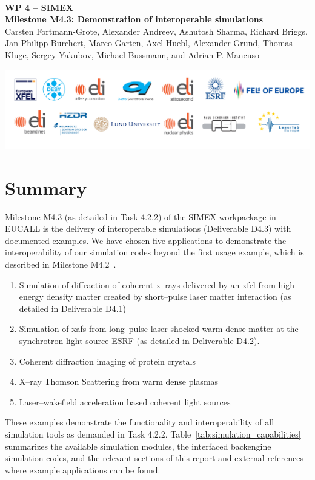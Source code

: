 \documentclass[12pt]{scrartcl}
\begin{document}
\makeatletter
\begin{titlepage}
\thispagestyle{scrheadings}
\begin{center}
  $~$\\
  \vspace{2cm}
  \Huge{\textbf{WP 4 -- SIMEX\\[1cm]
    Milestone M4.3: Demonstration of interoperable simulations%
  }}\\
  \vspace{2cm}
  \large{Carsten Fortmann-Grote, Alexander Andreev, Ashutosh Sharma, Richard
    Briggs, Jan-Philipp Burchert, Marco Garten, Axel Huebl, Alexander Grund,
  Thomas Kluge, Sergey Yakubov, Michael Bussmann, and Adrian P. Mancuso}
  \vspace{1cm}
  \date{\today}
\end{center}
\vfill%
\includegraphics[width=\textwidth]{figures/PartnerLogos_2017}
\end{titlepage}
\makeatother
%
\tableofcontents
%
\newpage
%
\section{Summary}\label{sec:summary}
Milestone M4.3 (as detailed in Task 4.2.2) of the SIMEX
workpackage in EUCALL is the delivery of interoperable simulations
(Deliverable D4.3) with documented examples. We have chosen five
applications to demonstrate the interoperability of our simulation codes beyond
the first usage example, which is described in Milestone
M4.2~\cite{EUCALL_SIMEX_M4.2}.
%
\begin{enumerate}
  \item Simulation of diffraction of coherent x--rays delivered by an
    \gls{xfel}
    from high energy density matter created by short--pulse
    laser matter interaction (as detailed in Deliverable D4.1)
  \item Simulation of \gls{xafs} from long--pulse laser
    shocked warm dense matter at the synchrotron light source ESRF (as detailed
    in Deliverable D4.2).
  \item Coherent diffraction imaging of protein crystals
  \item X--ray Thomson Scattering from warm dense plasmas
  \item Laser--wakefield acceleration based coherent light sources
\end{enumerate}
%
These examples demonstrate the functionality and interoperability of all
simulation tools as demanded in Task 4.2.2.
Table~\ref{tab:simulation_capabilities} summarizes the available simulation
modules, the interfaced backengine simulation codes, and the relevant sections
of this report and external references where example applications can be found.
\end{document}
